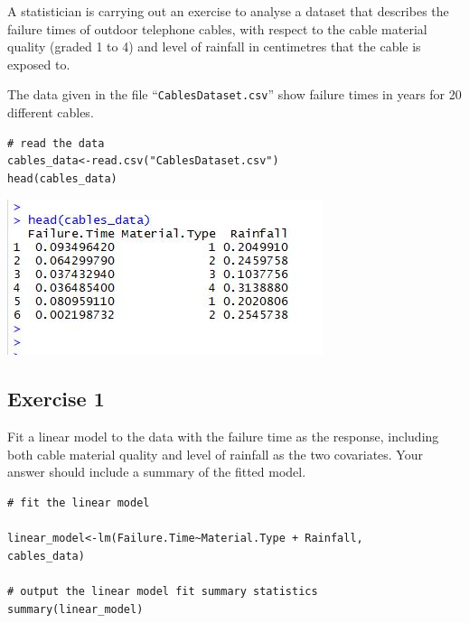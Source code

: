 \documentclass[a4paper,12pt]{article}
\begin{document}
\large 
\noindent A statistician is carrying out an exercise to analyse a dataset that describes the failure
times of outdoor telephone cables, with respect to the cable material quality (graded
1 to 4) and level of rainfall in centimetres that the cable is exposed to.

\medskip
\noindent The data given in the file “\texttt{CablesDataset.csv}” show failure times in years for 20
different cables.



\begin{framed}\begin{verbatim}
# read the data
cables_data<-read.csv("CablesDataset.csv")
head(cables_data)
\end{verbatim} \end{framed}

\includegraphics[scale=1.5]{00-A1/images/CablesData_1_head.JPG}

\newpage 

\subsection*{Exercise 1}
\noindent  Fit a linear model to the data with the failure time as the response, including
both cable material quality and level of rainfall as the two covariates. Your
answer should include a summary of the fitted model.\\
\medskip 




\begin{framed}\begin{verbatim}
# fit the linear model

linear_model<-lm(Failure.Time~Material.Type + Rainfall,
cables_data)

# output the linear model fit summary statistics
summary(linear_model)
\end{verbatim} \end{framed}
\end{document}
